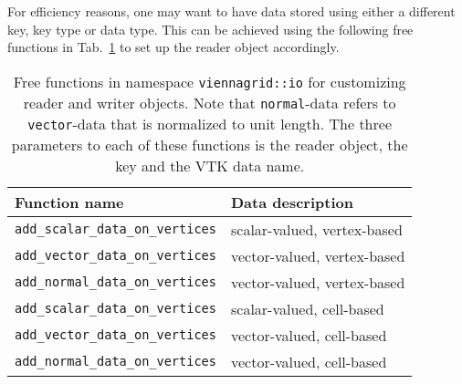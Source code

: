  For efficiency reasons, one may want to have data stored using either a different key, key type or data type.
 This can be achieved using the following free functions in Tab.~\ref{tab:customizing-io} to set up the reader object accordingly.

 \begin{table}[tb]
 \begin{center}
  \begin{tabular}{|l|l|}
   \hline
   Function name & Data description \\
   \hline
   \lstinline|add_scalar_data_on_vertices| & scalar-valued, vertex-based \\
   \lstinline|add_vector_data_on_vertices| & vector-valued, vertex-based \\
   \lstinline|add_normal_data_on_vertices| & vector-valued, vertex-based \\
   \hline
   \lstinline|add_scalar_data_on_vertices| & scalar-valued, cell-based \\
   \lstinline|add_vector_data_on_vertices| & vector-valued, cell-based \\
   \lstinline|add_normal_data_on_vertices| & vector-valued, cell-based \\
   \hline
  \end{tabular}
 \end{center}
 \caption{Free functions in namespace \lstinline|viennagrid::io| for customizing reader and writer objects. Note that \lstinline|normal|-data refers to \lstinline|vector|-data that is normalized to unit length. The three parameters to each of these functions is the reader object, the {\ViennaData} key and the VTK data name.}
 \label{tab:customizing-io}
 \end{table}
 



